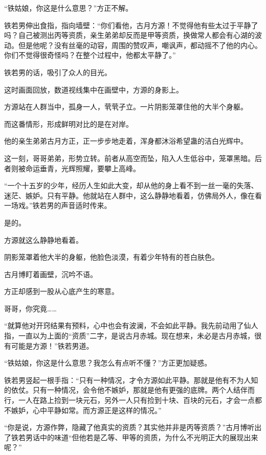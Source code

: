 
\begin{this_body}



“铁姑娘，你这是什么意思？”方正不解。

铁若男伸出食指，指向墙壁：“你们看他，古月方源！不觉得他有些太过于平静了吗？自己被测出丙等资质，亲生弟弟却反而是甲等资质，换做常人都会有心湖的波动。但是他呢？没有丝毫的动容，周围的赞叹声，嘲讽声，都动摇不了他的内心。你们不觉得很奇怪吗？在整个过程中，他都太平静了。”

铁若男的话，吸引了众人的目光。

这时画面回放，数道视线集中在画壁中，方源的身影上。

方源站在人群当中，孤身一人，茕茕孑立。一片阴影笼罩住他的大半个身躯。

而这番情形，形成鲜明对比的是在对岸。

他的亲生弟弟古月方正，正一步步地走着，浑身都沐浴希望蛊的洁白光辉中。

这一刻，哥哥弟弟，形势立转。前者从高空而坠，陷入人生低谷中，笼罩黑暗。后者则被命运垂青，光辉照耀，要攀上高峰。

“一个十五岁的少年，经历人生如此大变，却从他的身上看不到一丝一毫的失落、迷茫、嫉妒。只有平静。他就站在人群中，这么静静地看着，仿佛局外人，像在看一场戏。”铁若男的声音适时传来。

是的。

方源就这么静静地看着。

阴影笼罩着他大半的身躯，他脸色淡漠，有着少年特有的苍白肤色。

古月博盯着画壁，沉吟不语。

方正却感到一股从心底产生的寒意。

哥哥，你究竟……

“就算他对开窍结果有预料，心中也会有波澜，不会如此平静。我先前动用了仙人指，一直以为上面的“资质”二字，是说古月赤城。现在想来，未必是古月赤城，很有可能是方源！”铁若男道。

“铁姑娘，你这是什么意思？我怎么有点听不懂？”方正更加疑惑。

铁若男竖起一根手指：“只有一种情况，才令方源如此平静。那就是他有不为人知的依仗。只有一种情况，会令他不嫉妒，那就是他有更强的底牌。两个人结伴而行，一人在路上捡到一块元石，另外一人只有捡到十块、百块的元石，才会一点都不嫉妒，心中平静如常。而方源正是这样的情况。”

“你是说，方源作弊，隐藏了他真实的资质？其实他并非是丙等资质？”古月博听出了铁若男话中的味道“但他若是乙等、甲等的资质，为什么不光明正大的展现出来呢？”


\end{this_body}

